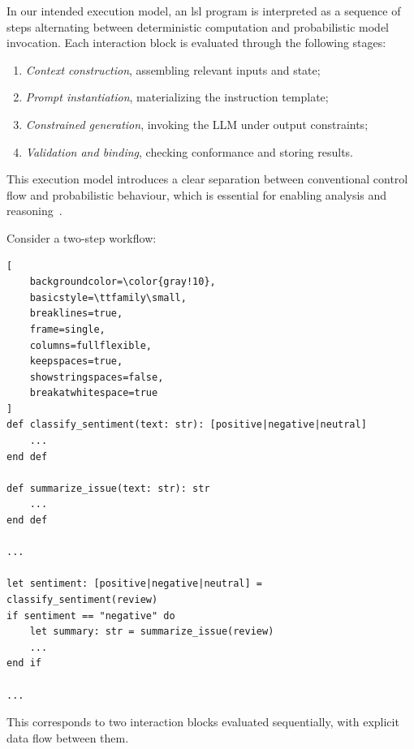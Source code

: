 \documentclass[manuscript,screen]{acmart}
\begin{document}

In our intended execution model, an \ac{lsl} program is interpreted as a sequence of steps alternating between deterministic computation and probabilistic model invocation. 
Each interaction block is evaluated through the following stages:

\begin{enumerate}
    \item \emph{Context construction}, assembling relevant inputs and state;
    \item \emph{Prompt instantiation}, materializing the instruction template;
    \item \emph{Constrained generation}, invoking the LLM under output constraints;
    \item \emph{Validation and binding}, checking conformance and storing results.
\end{enumerate}

This execution model introduces a clear separation between conventional control flow and probabilistic behaviour, which is essential for enabling analysis and reasoning~\cite{llm_se_roadmap}.

Consider a two-step workflow:

\begin{lstlisting}[
    backgroundcolor=\color{gray!10},
    basicstyle=\ttfamily\small,
    breaklines=true,
    frame=single,
    columns=fullflexible,
    keepspaces=true,
    showstringspaces=false,
    breakatwhitespace=true
]
def classify_sentiment(text: str): [positive|negative|neutral]
    ...
end def

def summarize_issue(text: str): str
    ...
end def

...

let sentiment: [positive|negative|neutral] = classify_sentiment(review)
if sentiment == "negative" do
    let summary: str = summarize_issue(review)
    ...
end if

...
\end{lstlisting}

This corresponds to two interaction blocks evaluated sequentially, with explicit data flow between them.
\end{document}
